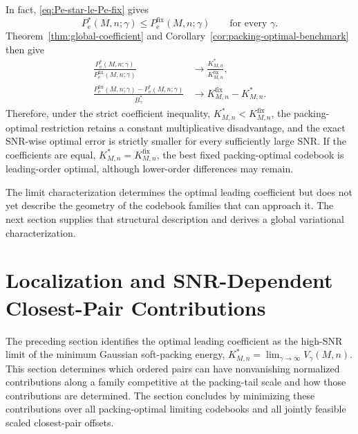 \documentclass[12pt,draftclsnofoot,onecolumn]{IEEEtran}
\newcommand{\Pe}{P_{\mathrm e}}
\theoremstyle{definition}
\begin{document}
 
In fact, \eqref{eq:Pe-star-le-Pe-fix} gives
\begin{equation*}
  \Pe^{\ast}(M,n;\gamma)
  \leq\Pe^{\mathrm{fix}}(M,n;\gamma)
  \qquad\text{for every \(\gamma\)}.
\end{equation*}
Theorem~\ref{thm:global-coefficient} and
Corollary~\ref{cor:packing-optimal-benchmark} then give
\begin{equation}
\begin{aligned}
  \frac{\Pe^{\ast}(M,n;\gamma)}
       {\Pe^{\mathrm{fix}}(M,n;\gamma)}
  &\longrightarrow
  \frac{K^{\ast}_{M,n}}{K^{\mathrm{fix}}_{M,n}},\\
  \frac{\Pe^{\mathrm{fix}}(M,n;\gamma)
        -\Pe^{\ast}(M,n;\gamma)}
       {B_\gamma^{\ast}}
  &\longrightarrow
  K^{\mathrm{fix}}_{M,n}-K^{\ast}_{M,n}.
\end{aligned}
\label{eq:optimized-exact-vs-fixed-packing}
\end{equation}
Therefore, under the strict coefficient inequality,
\(K^{\ast}_{M,n}<K^{\mathrm{fix}}_{M,n}\), the packing-optimal
restriction retains a constant
multiplicative disadvantage, and the exact SNR-wise optimal error is strictly
smaller for every sufficiently large SNR.  If the coefficients are equal,
\(K^{\ast}_{M,n}=K^{\mathrm{fix}}_{M,n}\),
the best fixed packing-optimal codebook is leading-order optimal, although
lower-order differences may remain.

The limit characterization determines the optimal leading coefficient
but does not yet describe the geometry of the codebook
families that can approach it.  The next section supplies that structural
description and derives a global variational characterization.

\section{Localization and SNR-Dependent Closest-Pair Contributions}
\label{sec:geometric-reduction}

The preceding section identifies the optimal leading coefficient as the
high-SNR limit of the minimum Gaussian soft-packing energy,
\(K^{\ast}_{M,n}=\lim_{\gamma\to\infty}V_\gamma(M,n)\).
This section determines which ordered pairs can have nonvanishing normalized
contributions along a family competitive at the packing-tail scale and how
those contributions are determined.     The section concludes by minimizing these
contributions over all packing-optimal limiting codebooks and all jointly
feasible scaled closest-pair offsets.
\end{document}
